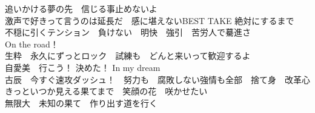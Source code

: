 {追いかける夢の先　信じる事止めないよ\\[1em]

激声で好きって言うのは延長だ　感に堪えないBEST TAKE 絶対にするまで\\
不穏に引くテンション　負けない　明快　強引　苦労人で驀進さ\\[-.3em]

On the road！\\
生粋　永久にずっとロック　試練も　どんと来いって歓迎するよ\\
自愛美　行こう！ 決めた！ In my dream\\
古辰　今すぐ速攻ダッシュ！　努力も　腐敗しない強情も全部　捨て身　改革心\\[-.3em]

きっといつか見える果てまで　笑顔の花　咲かせたい\\
無限大　未知の果て　作り出す道を行く

}


